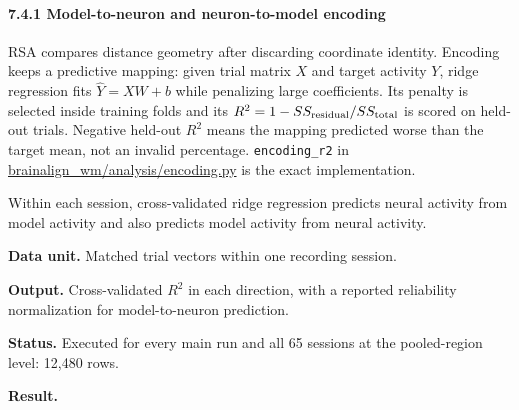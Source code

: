 \documentclass[
  10pt,
]{article}
\begin{document}
\hypertarget{model-to-neuron-and-neuron-to-model-encoding}{%
\paragraph{7.4.1 Model-to-neuron and neuron-to-model
encoding}\label{model-to-neuron-and-neuron-to-model-encoding}}

RSA compares distance geometry after discarding coordinate identity.
Encoding keeps a predictive mapping: given trial matrix \(X\) and target
activity \(Y\), ridge regression fits \(\widehat Y=XW+b\) while
penalizing large coefficients. Its penalty is selected inside training
folds and its \(R^2=1-SS_{\rm residual}/SS_{\rm total}\) is scored on
held-out trials. Negative held-out \(R^2\) means the mapping predicted
worse than the target mean, not an invalid percentage.
\texttt{encoding\_r2} in \url{brainalign_wm/analysis/encoding.py} is the
exact implementation.

Within each session, cross-validated ridge regression predicts neural
activity from model activity and also predicts model activity from
neural activity.

\textbf{Data unit.} Matched trial vectors within one recording session.

\textbf{Output.} Cross-validated \(R^2\) in each direction, with a
reported reliability normalization for model-to-neuron prediction.

\textbf{Status.} Executed for every main run and all 65 sessions at the
pooled-region level: 12,480 rows.

\textbf{Result.}
\end{document}
